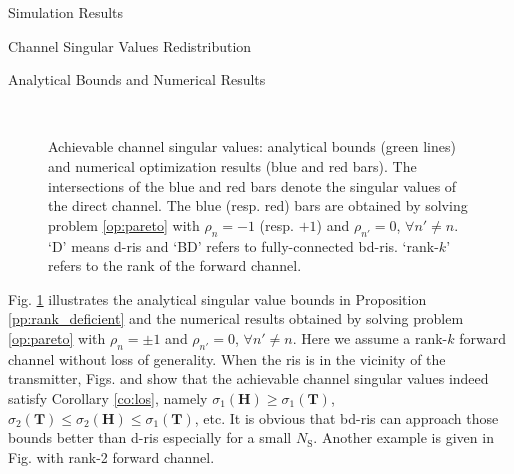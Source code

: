\begin{section}{Simulation Results}
\begin{subsection}{Channel Singular Values Redistribution}
	 \begin{subsubsection}{Analytical Bounds and Numerical Results}
		 \begin{figure}[!t]
			 \centering
			 \\
			 \caption{
				 Achievable channel singular values: analytical bounds (green lines) and numerical optimization results (blue and red bars).
				 The intersections of the blue and red bars denote the singular values of the direct channel.
				 The blue (resp. red) bars are obtained by solving problem \eqref{op:pareto} with $\rho_n = -1$ (resp. $+1$) and $\rho_{n'} = 0$, $\forall n' \ne n$.
				 `D' means \gls{d}-\gls{ris} and `BD' refers to fully-connected \gls{bd}-\gls{ris}.
				 `rank-$k$' refers to the rank of the forward channel.
			 }
			 \label{fg:singular_bound}
		 \end{figure}
		 Fig. \ref{fg:singular_bound} illustrates the analytical singular value bounds in Proposition \ref{pp:rank_deficient} and the numerical results obtained by solving problem \eqref{op:pareto} with $\rho_n = \pm 1$ and $\rho_{n'} = 0$, $\forall n' \ne n$.
		 Here we assume a rank-$k$ forward channel without loss of generality.
		 When the \gls{ris} is in the vicinity of the transmitter, Figs.  and  show that the achievable channel singular values indeed satisfy Corollary \ref{co:los}, namely $\sigma_1(\mathbf{H}) \ge \sigma_1(\mathbf{T})$, $\sigma_2(\mathbf{T}) \le \sigma_2(\mathbf{H}) \le \sigma_1(\mathbf{T})$, etc.
		 It is obvious that \gls{bd}-\gls{ris} can approach those bounds better than \gls{d}-\gls{ris} especially for a small $N_\mathrm{S}$.
		 Another example is given in Fig.  with rank-2 forward channel.

\end{subsubsection}
\end{subsection}
\end{section}
